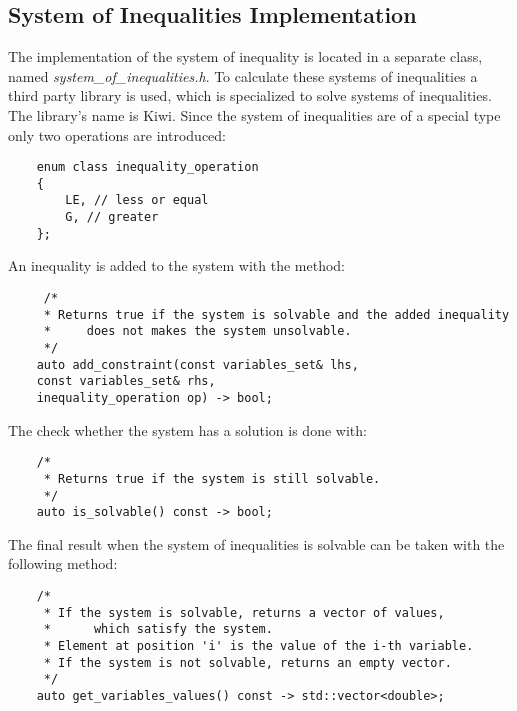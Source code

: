 \documentclass{article}
\begin{document}
	\subsection{System of Inequalities Implementation}
		The implementation of the system of inequality is located in
		a separate class, named \textit{system\_of\_inequalities.h}. 
		To calculate these systems of inequalities a third party 
		library is used, which is specialized to solve systems of
		inequalities. The library's name is Kiwi.
		Since the system of inequalities are of a special type
		only two operations are introduced:
\begin{lstlisting}
    enum class inequality_operation
    {
        LE, // less or equal
        G, // greater
    };
\end{lstlisting}
	An inequality is added to the system with the method:
\begin{lstlisting}
     /*
     * Returns true if the system is solvable and the added inequality
     *     does not makes the system unsolvable.
     */
    auto add_constraint(const variables_set& lhs,
	const variables_set& rhs, 
	inequality_operation op) -> bool;
\end{lstlisting}
	The check whether the system has a solution is done with:
\begin{lstlisting}
    /*
     * Returns true if the system is still solvable.
     */
    auto is_solvable() const -> bool;
\end{lstlisting}
	The final result when the system of inequalities is solvable can be 
	taken with the following method:
\begin{lstlisting}
    /*
     * If the system is solvable, returns a vector of values,
     *      which satisfy the system.
     * Element at position 'i' is the value of the i-th variable.
     * If the system is not solvable, returns an empty vector.
     */
    auto get_variables_values() const -> std::vector<double>;
\end{lstlisting}
\end{document}
